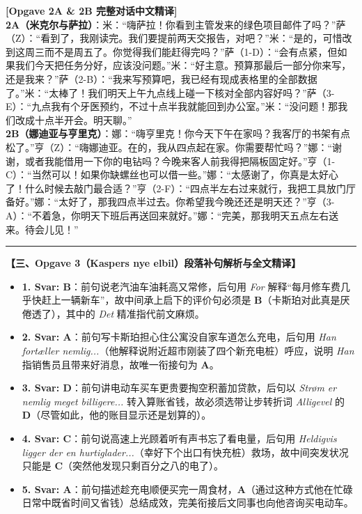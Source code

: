 \begin{answerbox}
\vspace{0.3em}
\textbf{\color{NCDTeal}[Opgave 2A \& 2B 完整对话中文精译]}\\
\textbf{2A（米克尔与萨拉）}：米：“嗨萨拉！你看到主管发来的绿色项目邮件了吗？”萨（Z）：“看到了，我刚读完。我们要提前两天交报告，对吧？”米：“是的，可惜改到这周三而不是周五了。你觉得我们能赶得完吗？”萨（1-D）：“会有点紧，但如果我们今天把任务分好，应该没问题。”米：“好主意。预算那最后一部分你来写，还是我来？”萨（2-B）：“我来写预算吧，我已经有现成表格里的全部数据了。”米：“太棒了！我们明天上午九点线上碰一下核对全部内容好吗？”萨（3-E）：“九点我有个牙医预约，不过十点半我就能回到办公室。”米：“没问题！那我们改成十点半开会。明天聊。”\\[3pt]
\textbf{2B（娜迪亚与亨里克）}：娜：“嗨亨里克！你今天下午在家吗？我客厅的书架有点松了。”亨（Z）：“嗨娜迪亚。在的，我从四点起在家。你需要帮忙吗？”娜：“谢谢，或者我能借用一下你的电钻吗？今晚来客人前我得把隔板固定好。”亨（1-C）：“当然可以！如果你缺螺丝也可以借一些。”娜：“太感谢了，你真是太好心了！什么时候去敲门最合适？”亨（2-F）：“四点半左右过来就行，我把工具放门厅备好。”娜：“太好了，那我四点半过去。你希望我今晚还还是明天还？”亨（3-A）：“不着急，你明天下班后再送回来就好。”娜：“完美，那我明天五点左右送来。待会儿见！”

\vspace{0.45em}
\hrule
\vspace{0.45em}
\textbf{\color{NCDNavy}【三、Opgave 3（Kaspers nye elbil）段落补句解析与全文精译】}
\begin{itemize}
  \item \textbf{1. Svar: B}：前句说老汽油车油耗高又常修，后句用 \textit{For} 解释“每月修车费几乎快赶上一辆新车”，故中间承上启下的评价句必须是 \textbf{B}（卡斯珀对此真是厌倦透了），其中的 \textit{Det} 精准指代前文麻烦。
  \item \textbf{2. Svar: A}：前句写卡斯珀担心住公寓没自家车道怎么充电，后句用 \textit{Han fortæller nemlig...}（他解释说附近超市刚装了四个新充电桩）呼应，说明 \textit{Han} 指销售员且带来好消息，故唯一衔接句为 \textbf{A}。
  \item \textbf{3. Svar: D}：前句讲电动车买车更贵要掏空积蓄加贷款，后句以 \textit{Strøm er nemlig meget billigere...} 转入算账省钱，故必须选带让步转折词 \textit{Alligevel} 的 \textbf{D}（尽管如此，他的账目显示还是划算的）。
  \item \textbf{4. Svar: C}：前句说高速上光顾着听有声书忘了看电量，后句用 \textit{Heldigvis ligger der en hurtiglader...}（幸好下个出口有快充桩）救场，故中间突发状况只能是 \textbf{C}（突然他发现只剩百分之八的电了）。
  \item \textbf{5. Svar: A}：前句描述趁充电顺便买完一周食材，\textbf{A}（通过这种方式他在忙碌日常中既省时间又省钱）总结成效，完美衔接后文同事也向他咨询买电动车。
\end{itemize}


\end{answerbox}
